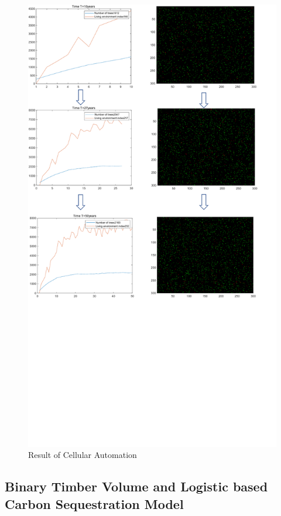 \documentclass{mcmthesis}
\numberwithin{figure}{section}
\numberwithin{table}{section}
\numberwithin{equation}{section}
\begin{document}
\begin{figure}[t]
  \centering
  \includegraphics[width = 14cm]{code&pic/CA-pic.pdf}
  \caption{Result of Cellular Automation}\label{CA_Result}
\end{figure}

\subsection{Binary Timber Volume and Logistic based Carbon Sequestration Model}
\end{document}
